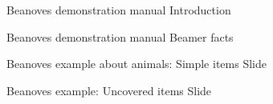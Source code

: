 \documentclass{beamer}
\begin{document}
\transdissolve[duration=0.5]

\begin{frame}
{Beanoves demonstration manual}
{Introduction}
\useMyIntroduction
\end{frame}

\begin{frame}
{Beanoves demonstration manual}
{Beamer facts}
\transpush[direction=180]
\useMyFacts
\end{frame}

%
%
\begin{frame}
{Beanoves example about animals: Simple items}
{Slide \insertslidenumber}
\transpush[direction=180]
\useMyStepI
\end{frame}
%
\begin{frame}
{Beanoves example: Uncovered items}
{Slide \insertslidenumber}
\transpush[direction=180]
\useMyStepII
\end{frame}
%
%
%
%
%
%
%
\end{document}
